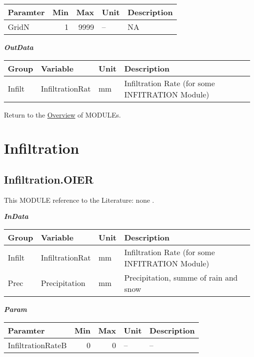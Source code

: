 \documentclass[
]{book}
\begin{document}
\begin{table}[!h]
\centering
\begin{tabular}{l|r|r|l|l}
\hline
Paramter & Min & Max & Unit & Description\\
\hline
GridN & 1 & 9999 & -- & NA\\
\hline
\end{tabular}
\end{table}

\textbf{\emph{OutData}}

\begin{table}[!h]
\centering
\begin{tabular}{l|l|l|l}
\hline
Group & Variable & Unit & Description\\
\hline
Infilt & InfiltrationRat & mm & Infiltration Rate (for some INFITRATION Module)\\
\hline
\end{tabular}
\end{table}

Return to the \protect\hyperlink{module}{Overview} of MODULEs.

\hypertarget{Infiltration}{%
\section{Infiltration}\label{Infiltration}}

\hypertarget{Infiltration.OIER}{%
\subsection{Infiltration.OIER}\label{Infiltration.OIER}}

This MODULE reference to the Literature: none \citep{none}.

\textbf{\emph{InData}}

\begin{table}[!h]
\centering
\begin{tabular}{l|l|l|l}
\hline
Group & Variable & Unit & Description\\
\hline
Infilt & InfiltrationRat & mm & Infiltration Rate (for some INFITRATION Module)\\
\cline{1-4}
Prec & Precipitation & mm & Precipitation, summe of rain and snow\\
\hline
\end{tabular}
\end{table}

\textbf{\emph{Param}}

\begin{table}[!h]
\centering
\begin{tabular}{l|r|r|l|l}
\hline
Paramter & Min & Max & Unit & Description\\
\hline
InfiltrationRateB & 0 & 0 & -- & --\\
\hline
\end{tabular}
\end{table}
\end{document}
